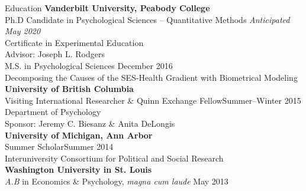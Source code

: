 \begin{rSection}{\textrm{Education}}
{\bf Vanderbilt University, Peabody College}\\
Ph.D Candidate in Psychological Sciences -- Quantitative Methods \hfill{\textit{Anticipated May 2020}}\\%
\hspace*{\pindent}Certificate in Experimental Education\\%
\hspace*{\pindent}Advisor: Joseph L. Rodgers%
\smallskip\\
M.S. in Psychological Sciences \hfill{December 2016} \\
\hspace*{\pindent}Decomposing the Causes of the SES-Health Gradient with Biometrical Modeling%
\medskip\\
\textbf{University of British Columbia}\\
Visiting International Researcher \& Quinn Exchange Fellow\hfill{Summer--Winter 2015}\\
\hspace*{\pindent}Department of Psychology\\
\hspace*{\pindent}Sponsor: Jeremy C. Biesanz \& Anita DeLongis\medskip\\
\textbf{University of Michigan, Ann Arbor}\\
Summer Scholar\hfill{Summer 2014}\\
\hspace*{\pindent}Interuniversity Consortium for Political and Social Research\medskip\\
{\bf Washington University in St. Louis}\\
{\em A.B} in Economics \& Psychology, \textit{magna cum laude} \hfill{May 2013}%
\end{rSection}